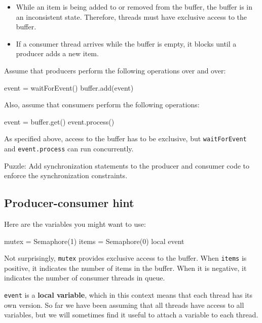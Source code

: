 \documentclass{book}
\begin{document}
\begin{itemize}

    \item While an item is being added to or removed from the buffer,
          the buffer is in an inconsistent state.  Therefore, threads must
          have exclusive access to the buffer.

    \item If a consumer thread arrives while the buffer is empty, it
          blocks until a producer adds a new item.

\end{itemize}

Assume that producers perform the following operations over and
over:

\begin{unbreakable}[title={Basic producer code}]{}
event = waitForEvent()
buffer.add(event)
\end{unbreakable}

Also, assume that consumers perform the following operations:

\begin{unbreakable}[title={Basic consumer code}]{}
event = buffer.get()
event.process()
\end{unbreakable}

As specified above, access to the buffer has to be exclusive,
but {\tt waitForEvent} and {\tt event.process}
can run concurrently.

Puzzle: Add synchronization statements to the producer and
consumer code to enforce the synchronization constraints.


\subsection{Producer-consumer hint}

Here are the variables you might want to use:

\begin{unbreakable}[title={Producer-consumer initialization}]{}
mutex = Semaphore(1)
items = Semaphore(0)
local event
\end{unbreakable}

Not surprisingly, {\tt mutex} provides exclusive access to
the buffer.  When {\tt items} is positive, it indicates the
number of items in the buffer.  When it is negative, it
indicates the number of consumer threads in queue.

    {\tt event} is a {\bf local variable}, which in this context means
that each thread has its own version.
So far we have been assuming that all threads have access
to all variables, but we will sometimes find it useful to
attach a variable to each thread.
\end{document}
